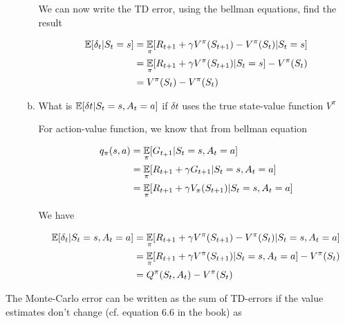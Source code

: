 \documentclass{exam}
\begin{document}
\begin{problem}
\begin{enumerate}
\begin{enumerate}[(a)]
\begin{solutionorlines}[2in]
    We can now write the TD error, using the bellman equations, find the result
    
    \begin{align*}
        \operatorname*{\mathbb{E}}[\delta_t | S_t = s] &= \operatorname*{\mathbb{E}}_{\pi}[R_{t+1} + \gamma V^{\pi}(S_{t+1}) - V^{\pi}(S_t) | S_t = s] \\
        &= \operatorname*{\mathbb{E}}_{\pi}[R_{t+1} + \gamma V^{\pi}(S_{t+1}) | S_t = s] - V^{\pi}(S_t) \\
        &= V^{\pi}(S_t) - V^{\pi}(S_t) \\
    \end{align*}
    \end{solutionorlines}
        
    \item What is $\operatorname*{\mathbb{E}}[\delta t |S_t = s, A_t = a]$ if $\delta t$ uses the true state-value function $V^\pi$
    \begin{solutionorlines}[2in]

    For action-value function, we know that from bellman equation
    
    \begin{align*}
        q_{\pi} (s, a) &= \operatorname*{\mathbb{E}}_{\pi}[G_{t_+1} | S_t = s, A_t = a] \\
        &= \operatorname*{\mathbb{E}}_{\pi}[R_{t+1} + \gamma G_{t+1} | S_t = s, A_t = a] \\
        &= \operatorname*{\mathbb{E}}_{\pi}[R_{t+1} + \gamma V_{\pi}(S_{t+1}) | S_t = s, A_t = a] 
    \end{align*}
    
    We have 
    
    \begin{align*}
        \operatorname*{\mathbb{E}}[\delta_t | S_t = s, A_t = a] &= \operatorname*{\mathbb{E}}_{\pi}[R_{t+1} + \gamma V^{\pi}(S_{t+1}) - V^{\pi}(S_t) | S_t = s, A_t = a] \\
        &= \operatorname*{\mathbb{E}}_{\pi}[R_{t+1} + \gamma V^{\pi}(S_{t+1}) | S_t = s, A_t = a] - V^{\pi}(S_t) \\
        &= Q^{\pi}(S_t, A_t) - V^{\pi}(S_t) \\
    \end{align*}
    \end{solutionorlines}
    \end{enumerate}
\end{enumerate}
\end{problem}


    \item The Monte-Carlo error can be written as the sum of TD-errors if the value estimates don’t change (cf. equation 6.6 in the book) as
    
\end{document}
